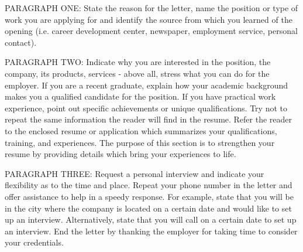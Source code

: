 \documentclass[10pt,stdletter,dateno,sigleft]{newlfm} %
\begin{document}
\begin{newlfm}


PARAGRAPH ONE: State the reason for the letter, name the position or type of work you are applying for and identify the source from which you learned of the opening (i.e. career development center, newspaper, employment service, personal contact).

PARAGRAPH TWO: Indicate why you are interested in the position, the company, its products, services - above all, stress what you can do for the employer. If you are a recent graduate, explain how your academic background makes you a qualified candidate for the position. If you have practical work experience, point out specific achievements or unique qualifications. Try not to repeat the same information the reader will find in the resume. Refer the reader to the enclosed resume or application which summarizes your qualifications, training, and experiences. The purpose of this section is to strengthen your resume by providing details which bring your experiences to life. 
 
PARAGRAPH THREE: Request a personal interview and indicate your flexibility as to the time and place. Repeat your phone number in the letter and offer assistance to help in a speedy response. For example, state that you will be in the city where the company is located on a certain date and would like to set up an interview. Alternatively, state that you will call on a certain date to set up an interview. End the letter by thanking the employer for taking time to consider your credentials. 


\end{newlfm}
\end{document}
